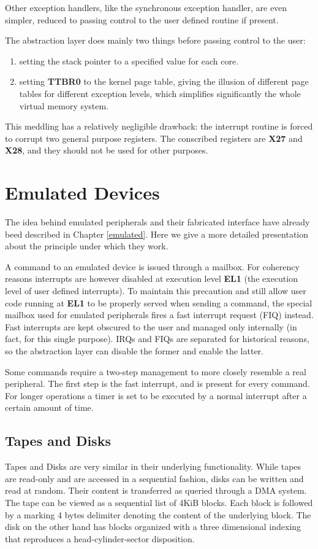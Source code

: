 \documentclass[12pt,a4paper,openright,twoside]{report}
\begin{document}

Other exception handlers, like the synchronous exception handler, are even 
simpler, reduced to passing control to the user defined routine if present.

The abstraction layer does mainly two things before passing control to the user:
\begin{enumerate}
    \item setting the stack pointer to a specified value for each core.
    \item setting \textbf{TTBR0} to the kernel page table, giving the illusion
        of different page tables for different exception levels, which simplifies
        significantly the whole virtual memory system.
\end{enumerate}
This meddling has a relatively negligible drawback: the interrupt routine is forced
to corrupt two general purpose registers. The conscribed registers are \textbf{X27}
and \textbf{X28}, and they should not be used for other purposes.

\section{Emulated Devices}
\label{emulateddev}
The idea behind emulated peripherals and their fabricated interface 
have already beed described in Chapter \ref{emulated}. Here we give a more detailed 
presentation about the principle under which they work.

A command to an emulated device is issued through a mailbox. For coherency reasons
interrupts are however disabled at execution level \textbf{EL1} (the execution
level of user defined interrupts). To maintain this precaution and still allow 
user code running at \textbf{EL1} to be properly served when sending a command, the
special mailbox used for emulated peripherals fires a fast interrupt request (FIQ)
instead.
Fast interrupts are kept obscured to the user and managed only internally (in fact,
for this single purpose). IRQs and FIQs are separated for historical reasons, so 
the abstraction layer can disable the former and enable the latter.

Some commands require a two-step management to more closely resemble a real peripheral.
The first step is the fast interrupt, and is present for every command. For longer
operations a timer is set to be executed by a normal interrupt after a certain amount
of time.

\subsection{Tapes and Disks}
Tapes and Disks are very similar in their underlying functionality. While tapes 
are read-only and are accessed in a sequential fashion, disks can be written and
read at random. Their content is transferred as queried through a DMA system.
The tape can be viewed as a sequential list of 4KiB blocks. Each block is followed
by a marking 4 bytes delimiter denoting the content of the underlying block.
The disk on the other hand has blocks organized with a three dimensional indexing
that reproduces a head-cylinder-sector disposition.
\end{document}
